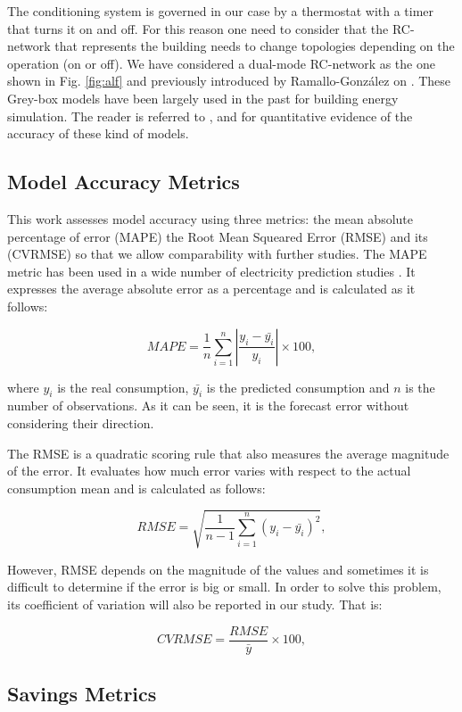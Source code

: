 \documentclass[10pt, conference, compsocconf]{IEEEtran}
\begin{document}
The conditioning system is governed in our case by a thermostat with a timer that turns it on and off. For this reason one need to consider that the RC-network that represents the building needs to change topologies depending on the operation (on or off). We have considered a dual-mode RC-network as the one shown in Fig. \ref{fig:alf} and previously introduced by Ramallo-Gonz\'alez on \cite{ramalloidentifying}. 
These Grey-box models have been largely used in the past for building energy simulation. The reader is referred to \cite{bacher2011identifying}, \cite{coley1992second} and \cite{ramalloidentifying} for quantitative evidence of the accuracy of these kind of models.





\subsection{Model Accuracy Metrics}

This work assesses model accuracy using three metrics: the mean absolute percentage of error (MAPE) the Root Mean Squeared Error (RMSE) and its  (CVRMSE) so that we allow comparability with further studies.
The MAPE metric has been used in a wide number of electricity prediction studies \cite{fan2014development, edwards2012predicting}
. It expresses the average absolute error as a percentage and is calculated as it follows:

\[
 MAPE = \frac{1}{n}\sum_{i=1}^{n} |\frac{y_i-\bar{y_i}}{y_i}|\times 100,
\]

where $y_i$ is the real consumption, $\bar{y_i}$ is the predicted consumption and $n$ is the number of observations. As it can be seen, it is the forecast error without considering their direction.

The RMSE is a quadratic scoring rule that also measures the average magnitude of the error. It evaluates how much error varies with respect to the actual consumption mean and is calculated as follows:

\[
 RMSE = \sqrt{\frac{1}{n-1}\sum_{i=1}^{n}(y_i-\bar{y_i})^2} ,
\]

However, RMSE depends on the magnitude of the values and sometimes it is difficult to determine if the error is big or small. In order to solve this problem, its coefficient of variation will also be reported in our study. That is:

\[
 CVRMSE = \frac{RMSE}{\bar{y}} \times 100,
\]


\subsection{Savings Metrics}
\end{document}
